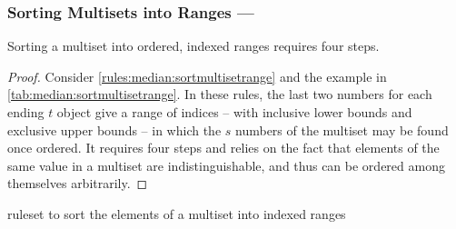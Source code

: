 \subsubsection{Sorting Multisets into Ranges --- }\label{sec:median:sortmultisetrange}

\begin{proposition}\label{prop:median:sortmultisetrange}
Sorting a multiset into ordered, indexed ranges requires four steps.
\end{proposition}

\begin{proof}
Consider \cref{rules:median:sortmultisetrange} and the example in \cref{tab:median:sortmultisetrange}.  In these rules, the last two numbers for each ending \(t\) object give a range of indices -- with inclusive lower bounds and exclusive upper bounds -- in which the \(s\) numbers of the multiset may be found once ordered.  It requires four steps and relies on the fact that elements of the same value in a multiset are indistinguishable, and thus can be ordered among themselves arbitrarily.

\end{proof}

\begin{cprulesetfloat}
\begin{cpruleset}




\end{cpruleset}
\caption{\label{rules:median:sortmultisetrange}\Gls{ruleset} to sort the elements of a multiset into indexed ranges}
\end{cprulesetfloat}

